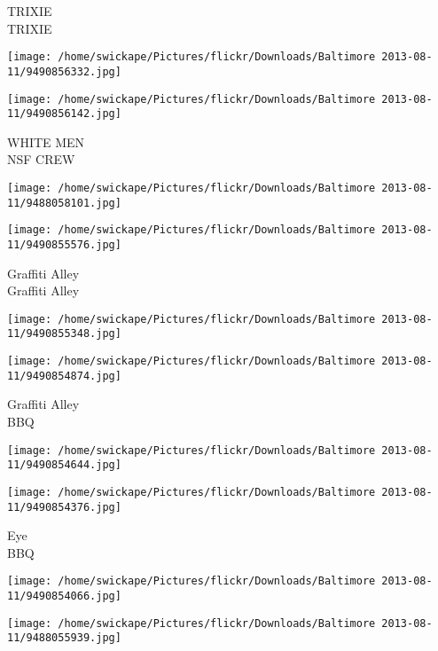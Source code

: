 \documentclass[10pt,letterpaper]{article}
\begin{document}
TRIXIE\\
TRIXIE\\
\pagebreak

\texttt{[image: /home/swickape/Pictures/flickr/Downloads/Baltimore 2013-08-11/9490856332.jpg]}

\vspace{0.25in}
\texttt{[image: /home/swickape/Pictures/flickr/Downloads/Baltimore 2013-08-11/9490856142.jpg]}

WHITE MEN\\
NSF CREW\\
\pagebreak

\texttt{[image: /home/swickape/Pictures/flickr/Downloads/Baltimore 2013-08-11/9488058101.jpg]}

\vspace{0.25in}
\texttt{[image: /home/swickape/Pictures/flickr/Downloads/Baltimore 2013-08-11/9490855576.jpg]}

Graffiti Alley\\
Graffiti Alley\\
\pagebreak

\texttt{[image: /home/swickape/Pictures/flickr/Downloads/Baltimore 2013-08-11/9490855348.jpg]}

\vspace{0.25in}
\texttt{[image: /home/swickape/Pictures/flickr/Downloads/Baltimore 2013-08-11/9490854874.jpg]}

Graffiti Alley\\
BBQ\\
\pagebreak

\texttt{[image: /home/swickape/Pictures/flickr/Downloads/Baltimore 2013-08-11/9490854644.jpg]}

\vspace{0.25in}
\texttt{[image: /home/swickape/Pictures/flickr/Downloads/Baltimore 2013-08-11/9490854376.jpg]}

Eye\\
BBQ\\
\pagebreak

\texttt{[image: /home/swickape/Pictures/flickr/Downloads/Baltimore 2013-08-11/9490854066.jpg]}

\vspace{0.25in}
\texttt{[image: /home/swickape/Pictures/flickr/Downloads/Baltimore 2013-08-11/9488055939.jpg]}
\end{document}
